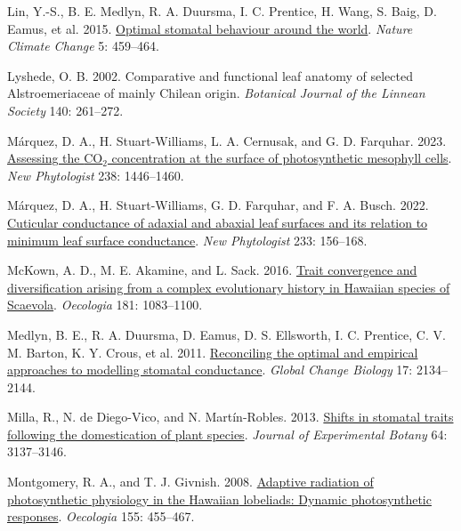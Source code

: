 \documentclass[
  letterpaper,
  DIV=11,
  numbers=noendperiod]{scrartcl}
\newlength{\cslhangindent}
\newlength{\cslentryspacingunit} %
\newenvironment{CSLReferences}[2] %
 {%
  \setlength{\parindent}{0pt}
  \ifodd #1
  \let\oldpar\par
  \def\par{\hangindent=\cslhangindent\oldpar}
  \fi
  \setlength{\parskip}{#2\cslentryspacingunit}
 }%
 {}
\begin{document}
\begin{CSLReferences}{1}{0}
\leavevmode{}%
Lin, Y.-S., B. E. Medlyn, R. A. Duursma, I. C. Prentice, H. Wang, S.
Baig, D. Eamus, et al. 2015.
\href{https://doi.org/10.1038/nclimate2550}{Optimal stomatal behaviour
around the world}. \emph{Nature Climate Change} 5: 459--464.

\leavevmode{}%
Lyshede, O. B. 2002. Comparative and functional leaf anatomy of selected
{Alstroemeriaceae} of mainly {Chilean} origin. \emph{Botanical Journal
of the Linnean Society} 140: 261--272.

\leavevmode{}%
Márquez, D. A., H. Stuart-Williams, L. A. Cernusak, and G. D. Farquhar.
2023. \href{https://doi.org/10.1111/nph.18784}{Assessing the
{CO}\(_{\textrm{2}}\) concentration at the surface of photosynthetic
mesophyll cells}. \emph{New Phytologist} 238: 1446--1460.

\leavevmode{}%
Márquez, D. A., H. Stuart-Williams, G. D. Farquhar, and F. A. Busch.
2022. \href{https://doi.org/10.1111/nph.17588}{Cuticular conductance of
adaxial and abaxial leaf surfaces and its relation to minimum leaf
surface conductance}. \emph{New Phytologist} 233: 156--168.

\leavevmode{}%
McKown, A. D., M. E. Akamine, and L. Sack. 2016.
\href{https://doi.org/10.1007/s00442-016-3640-3}{Trait convergence and
diversification arising from a complex evolutionary history in
{Hawaiian} species of {Scaevola}}. \emph{Oecologia} 181: 1083--1100.

\leavevmode{}%
Medlyn, B. E., R. A. Duursma, D. Eamus, D. S. Ellsworth, I. C. Prentice,
C. V. M. Barton, K. Y. Crous, et al. 2011.
\href{https://doi.org/10.1111/j.1365-2486.2010.02375.x}{Reconciling the
optimal and empirical approaches to modelling stomatal conductance}.
\emph{Global Change Biology} 17: 2134--2144.

\leavevmode{}%
Milla, R., N. de Diego-Vico, and N. Martín-Robles. 2013.
\href{https://doi.org/10.1093/jxb/ert147}{Shifts in stomatal traits
following the domestication of plant species}. \emph{Journal of
Experimental Botany} 64: 3137--3146.

\leavevmode{}%
Montgomery, R. A., and T. J. Givnish. 2008.
\href{https://doi.org/10.1007/s00442-007-0936-3}{Adaptive radiation of
photosynthetic physiology in the {Hawaiian} lobeliads: Dynamic
photosynthetic responses}. \emph{Oecologia} 155: 455--467.


\end{CSLReferences}
\end{document}
